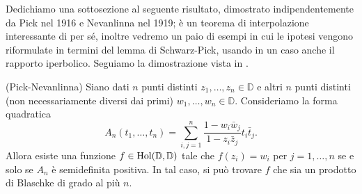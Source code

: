 Dedichiamo una sottosezione al seguente risultato, dimostrato indipendentemente da Pick nel 1916 \cite{P} e Nevanlinna nel 1919; è un teorema di interpolazione interessante di per sé, inoltre vedremo un paio di esempi in cui le ipotesi vengono riformulate in termini del lemma di Schwarz-Pick, usando in un caso anche il rapporto iperbolico. Seguiamo la dimostrazione vista in \cite[Chapter 1, Theorem 2.2]{JBG}.

\begin{thm}
  (Pick-Nevanlinna) Siano dati $n$ punti distinti $z_1, \dots, z_n \in \mathbb{D}$ e altri $n$ punti distinti (non necessariamente diversi dai primi) $w_1, \dots, w_n \in \mathbb{D}$. Consideriamo la forma quadratica
  $$A_n(t_1,\dots,t_n)=\sum_{i,j=1}^n\frac{1-w_i\bar{w}_j}{1-z_i\bar{z}_j}t_i\bar{t}_j.$$
  Allora esiste una funzione $f \in \normalfont{\text{Hol}}(\mathbb{D},\mathbb{D})$ tale che $f(z_i)=w_i$ per $j=1, \dots, n$ se e solo se $A_n$ è semidefinita positiva. In tal caso, si può trovare $f$ che sia un prodotto di Blaschke di grado al più $n$.
\end{thm}

